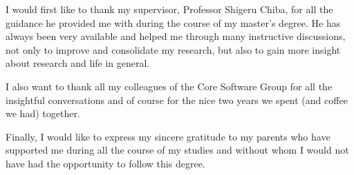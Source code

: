 \begin{acknowledgements}
  I would first like to thank my supervisor, Professor Shigeru Chiba, for all
  the guidance he provided me with during the course of my master's degree. He
  has always been very available and helped me through many instructive
  discussions, not only to improve and consolidate my research, but also to
  gain more insight about research and life in general.

  I also want to thank all my colleagues of the Core Software Group for all the
  insightful conversations and of course for the nice two years we spent
  (and coffee we had) together.

  Finally, I would like to express my sincere gratitude to my parents who have
  supported me during all the course of my studies and without whom I would not
  have had the opportunity to follow this degree.
\end{acknowledgements}
